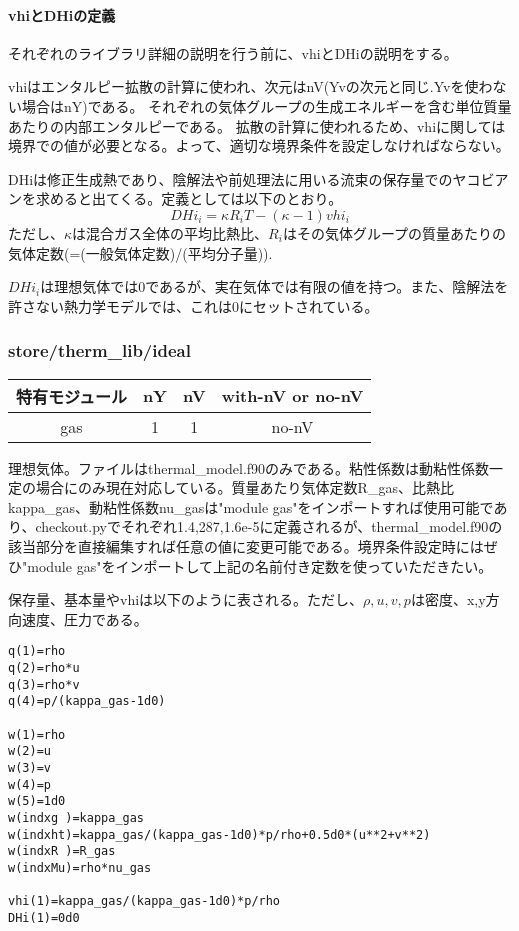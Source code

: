 \documentclass{jsarticle}
\begin{document}
\paragraph{vhiとDHiの定義}%
それぞれのライブラリ詳細の説明を行う前に、vhiとDHiの説明をする。

vhiはエンタルピー拡散の計算に使われ、次元はnV(Yvの次元と同じ.Yvを使わない場合はnY)である。
それぞれの気体グループの生成エネルギーを含む単位質量あたりの内部エンタルピーである。
拡散の計算に使われるため、vhiに関しては境界での値が必要となる。よって、適切な境界条件を設定しなければならない。

DHiは修正生成熱であり、陰解法や前処理法に用いる流束の保存量でのヤコビアンを求めると出てくる。定義としては以下のとおり。
\begin{equation}
DHi_i=\kappa R_i T-(\kappa-1)vhi_i
\end{equation}
ただし、$\kappa$は混合ガス全体の平均比熱比、$R_i$はその気体グループの質量あたりの気体定数(=(一般気体定数)/(平均分子量)).

$DHi_i$は理想気体では0であるが、実在気体では有限の値を持つ。また、陰解法を許さない熱力学モデルでは、これは0にセットされている。

\subsubsection{store/therm\_lib/ideal}%
\begin{center}
\begin{tabular}{cccc}\hline
特有モジュール & nY & nV & with-nV or no-nV\\\hline
gas            &  1 &  1 & no-nV\\
\hline
\end{tabular}
\end{center}

理想気体。ファイルはthermal\_model.f90のみである。粘性係数は動粘性係数一定の場合にのみ現在対応している。質量あたり気体定数R\_gas、比熱比kappa\_gas、動粘性係数nu\_gasは"module gas"をインポートすれば使用可能であり、checkout.pyでそれぞれ1.4,287,1.6e-5に定義されるが、thermal\_model.f90の該当部分を直接編集すれば任意の値に変更可能である。境界条件設定時にはぜひ"module gas"をインポートして上記の名前付き定数を使っていただきたい。

保存量、基本量やvhiは以下のように表される。ただし、$\rho,u,v,p$は密度、x,y方向速度、圧力である。
\begin{verbatim}
q(1)=rho
q(2)=rho*u
q(3)=rho*v
q(4)=p/(kappa_gas-1d0)

w(1)=rho
w(2)=u
w(3)=v
w(4)=p
w(5)=1d0
w(indxg )=kappa_gas
w(indxht)=kappa_gas/(kappa_gas-1d0)*p/rho+0.5d0*(u**2+v**2)
w(indxR )=R_gas
w(indxMu)=rho*nu_gas

vhi(1)=kappa_gas/(kappa_gas-1d0)*p/rho
DHi(1)=0d0
\end{verbatim}
\end{document}
